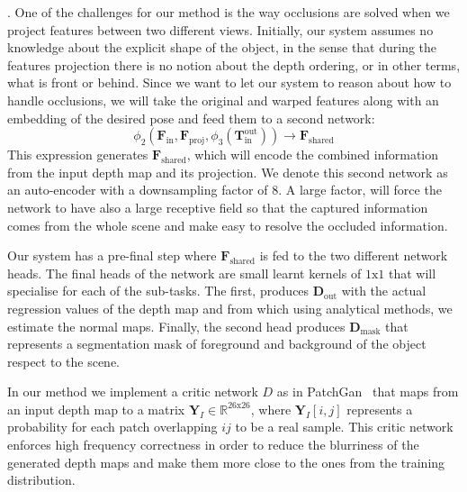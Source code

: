 \vspace{1mm}
. One of the challenges for our method is the way occlusions are solved when we project features between two different views. Initially, our system assumes no knowledge about the explicit shape of the object, in the  sense that during the features projection there is no notion about the depth ordering,  or in other terms, what is front or behind. Since we want to let our system to reason about how to handle occlusions, we will take the original and warped features along with an embedding of the desired pose and feed  them to a second network:
\begin{equation}
    \phi_2(\mathbf{F}_{\textrm{in}}, \mathbf{F}_{\textrm{proj}}, \phi_3(\mathbf{T}_{\textrm{in}}^{\textrm{out}})) \rightarrow \mathbf{F}_{\textrm{shared}}
\end{equation}
This expression generates $\mathbf{F}_{\textrm{shared}}$, which will encode the combined information from the input depth map and its projection. We denote this second network as an auto-encoder with a downsampling factor of $8$. A large factor, will force the network to have also a large receptive field so that the captured information comes from the whole scene and make easy to resolve the occluded information.

\vspace{1mm}
 Our system has a pre-final step where $\mathbf{F}_{\textrm{shared}}$ is fed to the two different network heads. The final heads of the network are small learnt kernels of $1\textrm{x}1$ that will specialise for each of the sub-tasks. The first, produces $\mathbf{D}_{\textrm{out}}$ with the actual regression values of the depth map and from which using analytical methods, we estimate the normal maps. Finally, the second head produces $\mathbf{D}_{\textrm{mask}}$ that represents a segmentation mask of foreground and background of the object respect to the scene.


\vspace{1mm}
 In our method we implement a critic network $D$ as in PatchGan~\cite{isola2018imagetoimage} that maps from an input depth map to a matrix $\mathbf{Y}_{I} \in \mathbb{R}^{26\text{x}26}$, where $\mathbf{Y}_I[i,j]$ represents a probability for each patch overlapping $ij$ to be a real sample. This critic network enforces high frequency correctness in order to reduce the blurriness of the generated depth maps and make them more close to the ones from the training distribution.


